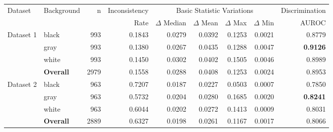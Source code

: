 \begin{tabular}{llrrrrrrr}
\toprule
Dataset & Background & n & Inconsistency & \multicolumn{4}{c}{Basic Statistic Variations} & Discrimination \\
\cmidrule(lr){5-8}\cmidrule(lr){9-9}
& & & Rate & $\Delta$ Median & $\Delta$ Mean & $\Delta$ Max & $\Delta$ Min & AUROC \\
\midrule
\multirow{4}{*}{Dataset 1} & black & 993 & 0.1843 & 0.0279 & 0.0392 & 0.1253 & 0.0021 & 0.8779 \\
 & gray & 993 & 0.1380 & 0.0267 & 0.0435 & 0.1288 & 0.0047 & \textbf{0.9126} \\
 & white & 993 & 0.1450 & 0.0302 & 0.0402 & 0.1505 & 0.0046 & 0.8989 \\
 & \textbf{Overall} & 2979 & 0.1558 & 0.0288 & 0.0408 & 0.1253 & 0.0024 & 0.8953 \\
\midrule
\multirow{4}{*}{Dataset 2} & black & 963 & 0.7207 & 0.0187 & 0.0227 & 0.0503 & 0.0007 & 0.7850 \\
 & gray & 963 & 0.5732 & 0.0204 & 0.0280 & 0.1685 & 0.0020 & \textbf{0.8241} \\
 & white & 963 & 0.6044 & 0.0202 & 0.0272 & 0.1413 & 0.0009 & 0.8031 \\
 & \textbf{Overall} & 2889 & 0.6327 & 0.0198 & 0.0261 & 0.1167 & 0.0017 & 0.8066 \\
\bottomrule
\end{tabular}
